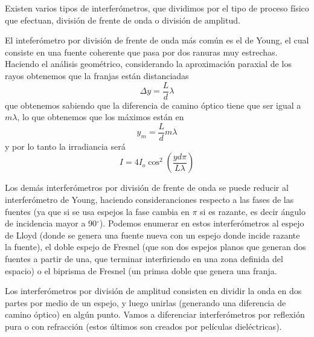 \documentclass[a4paper]{article}
\numberwithin{equation}{section}
\begin{document}
	Existen varios tipos de interferómetros, que dividimos por el tipo de proceso físico que efectuan, división de frente de onda o división de amplitud. 
	
	El inteferómetro por división de frente de onda más común es el de Young, el cual consiste en una fuente coherente que pasa por dos ranuras muy estrechas. Haciendo el análisis geométrico, considerando la aproximación paraxial de los rayos obtenemos que la franjas están distanciadas
	\begin{equation}
		\Delta y = \frac{L}{d}\lambda
		\label{eq:interferencia_young_interfranja}
	\end{equation}
	que obtenemos sabiendo que la diferencia de camino óptico tiene que ser igual a $m\lambda$, lo que obtenemos que los máximos están en 
	\begin{equation}
		y_m = \frac{L}{d} m \lambda
		\label{eq:interferencia_young_maximos}
	\end{equation}
	y por lo tanto la irradiancia será
	\begin{equation}
		I = 4 I_o \cos^2\left(\frac{y d \pi}{L\lambda}\right)
		\label{eq:interferencia_young_irradiancia}
	\end{equation}
	
	Los demás interferómetros por división de frente de onda se puede reducir al interferómetro de Young, haciendo consideranciones respecto a las fases de las fuentes (ya que si se usa espejos la fase cambia en $\pi$ si es razante, es decir ángulo de incidencia mayor a 90$^\circ$). Podemos enumerar en estos interferómetros al espejo de Lloyd (donde se genera una fuente nueva con un espejo donde incide razante la fuente), el doble espejo de Fresnel (que son dos espejos planos que generan dos fuentes a partir de una, que terminar interfiriendo en una zona definida del espacio) o el biprisma de Fresnel (un primsa doble que genera una franja.
	
	Los interferómetros por división de amplitud consisten en dividir la onda en dos partes por medio de un espejo, y luego unirlas (generando una diferencia de camino óptico) en algún punto. Vamos a diferenciar interferómetros por reflexión pura o con refracción (estos últimos son creados por películas dieléctricas). 
	
\end{document}
